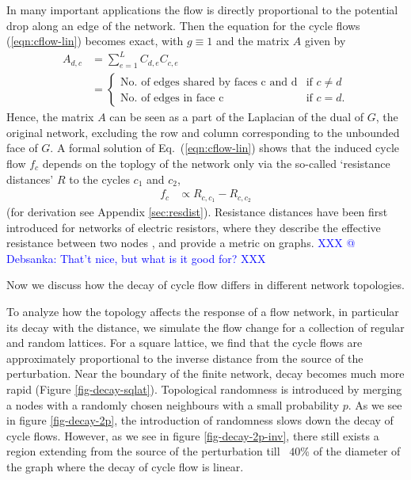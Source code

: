 \documentclass[10pt,aps,pra,twocolumn,superscriptaddress]{revtex4-1}
\newcommand{\dirk}[1]{\textcolor{blue}{#1}}
\begin{document}
In many important applications the flow is directly proportional to the
potential drop along an edge of the network.
Then the equation for the cycle flows (\ref{eqn:cflow-lin}) becomes exact,
with $g \equiv 1$ and the matrix $A$ given by 
\begin{align}
   \label{eqn:lin-Lapldef}
   A_{d,c} &= \sum_{e=1}^L C_{d,e} C_{c,e} \\
           &=
	     \begin{cases}
	     \text{No. of edges shared by faces c and d} & \text{if } c\neq d\\
	     \text{No. of edges in face c} & \text{if } c=d.
	     \end{cases}
    \nonumber	     
\end{align}
Hence, the matrix $A$ can be seen as a part of the Laplacian of the dual  
of $G$, the original network, excluding the row and column corresponding to 
the unbounded face of $G$. A formal solution of Eq.~(\ref{eqn:cflow-lin}) 
shows that the induced cycle flow $f_c$ depends on the toplogy of the 
network only via the so-called `resistance distances' $R$ to the cycles
$c_1$ and $c_2$,
\begin{align}
    \label{eq:fc-resdist}
   f_c &\propto R_{c,c_1}-R_{c,c_2}
\end{align}
(for derivation see Appendix \ref{sec:resdist}).
Resistance distances have been first introduced for networks of electric resistors,
where they describe the effective resistance between two nodes \cite{Klei93},
and provide a metric on graphs.
\dirk{XXX @ Debsanka: That't nice, but what is it good for? XXX}

Now we discuss how the decay of cycle flow differs in different network 
topologies.  

To analyze how the topology affects the response of a flow network, in particular
its decay with the distance, we simulate the flow change for a collection of regular and 
random lattices. 
For a square lattice, we find that the cycle flows are approximately proportional to the 
inverse distance from the source of the perturbation. Near the boundary of the finite
network, decay becomes much more rapid (Figure \ref{fig-decay-sqlat}). 
Topological randomness is introduced by merging a nodes with a randomly chosen 
neighbours with a small probability $p$.  As we see in figure \ref{fig-decay-2p}, the 
introduction of randomness slows down the decay of cycle flows.  
However, as we see in figure \ref{fig-decay-2p-inv}, there still exists a 
region extending from the source of the perturbation till ~$40$\% of the 
diameter of the graph where the decay of cycle flow is linear.  
\end{document}
